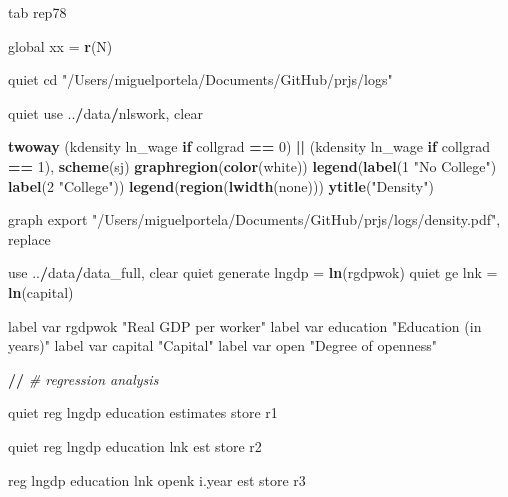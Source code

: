 \documentclass[
  12pt,
]{article}
\newenvironment{Shaded}{\begin{snugshade}}{\end{snugshade}}
\newcommand{\CommentTok}[1]{\textcolor[rgb]{0.56,0.35,0.01}{\textit{#1}}}
\newcommand{\ControlFlowTok}[1]{\textcolor[rgb]{0.13,0.29,0.53}{\textbf{#1}}}
\newcommand{\DecValTok}[1]{\textcolor[rgb]{0.00,0.00,0.81}{#1}}
\newcommand{\ErrorTok}[1]{\textcolor[rgb]{0.64,0.00,0.00}{\textbf{#1}}}
\newcommand{\KeywordTok}[1]{\textcolor[rgb]{0.13,0.29,0.53}{\textbf{#1}}}
\newcommand{\NormalTok}[1]{#1}
\newcommand{\OperatorTok}[1]{\textcolor[rgb]{0.81,0.36,0.00}{\textbf{#1}}}
\newcommand{\StringTok}[1]{\textcolor[rgb]{0.31,0.60,0.02}{#1}}
\begin{document}
\begin{Shaded}
\begin{Highlighting}[]
\NormalTok{tab rep78}

\NormalTok{global xx =}\StringTok{ }\KeywordTok{r}\NormalTok{(N)}

\NormalTok{quiet cd }\StringTok{"/Users/miguelportela/Documents/GitHub/prjs/logs"}

\NormalTok{quiet use ..}\OperatorTok{/}\NormalTok{data}\OperatorTok{/}\NormalTok{nlswork, clear}

\KeywordTok{twoway}\NormalTok{ (kdensity ln_wage }\ControlFlowTok{if}\NormalTok{ collgrad }\OperatorTok{==}\StringTok{ }\DecValTok{0}\NormalTok{) }\OperatorTok{||}\StringTok{ }\NormalTok{(kdensity ln_wage }\ControlFlowTok{if}\NormalTok{ collgrad }\OperatorTok{==}\StringTok{ }\DecValTok{1}\NormalTok{), }\KeywordTok{scheme}\NormalTok{(sj) }\KeywordTok{graphregion}\NormalTok{(}\KeywordTok{color}\NormalTok{(white)) }\KeywordTok{legend}\NormalTok{(}\KeywordTok{label}\NormalTok{(}\DecValTok{1} \StringTok{"No College"}\NormalTok{) }\KeywordTok{label}\NormalTok{(}\DecValTok{2} \StringTok{"College"}\NormalTok{)) }\KeywordTok{legend}\NormalTok{(}\KeywordTok{region}\NormalTok{(}\KeywordTok{lwidth}\NormalTok{(none))) }\KeywordTok{ytitle}\NormalTok{(}\StringTok{"Density"}\NormalTok{)}

\NormalTok{graph export }\StringTok{"/Users/miguelportela/Documents/GitHub/prjs/logs/density.pdf"}\NormalTok{, replace}

\NormalTok{use ..}\OperatorTok{/}\NormalTok{data}\OperatorTok{/}\NormalTok{data_full, clear}
\NormalTok{        quiet generate lngdp =}\StringTok{ }\KeywordTok{ln}\NormalTok{(rgdpwok)}
\NormalTok{        quiet ge lnk =}\StringTok{ }\KeywordTok{ln}\NormalTok{(capital)}

\NormalTok{        label var rgdpwok }\StringTok{"Real GDP per worker"}
\NormalTok{        label var education }\StringTok{"Education (in years)"}
\NormalTok{        label var capital }\StringTok{"Capital"}
\NormalTok{        label var open }\StringTok{"Degree of openness"}

\OperatorTok{/}\ErrorTok{/}\StringTok{ }\CommentTok{# regression analysis}

\StringTok{    }\NormalTok{quiet reg lngdp education}
\NormalTok{        estimates store r1}

\NormalTok{    quiet reg lngdp education lnk}
\NormalTok{        est store r2}

\NormalTok{    reg lngdp education lnk openk i.year}
\NormalTok{        est store r3}


\end{Highlighting}
\end{Shaded}
\end{document}
